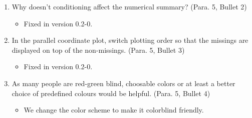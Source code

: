 \documentclass[12pt,english]{article}
\begin{document}
\begin{enumerate}
\item Why doesn\textquoteright{}t conditioning affect the numerical summary?
(Para. 5, Bullet 2)
\begin{itemize}
\item Fixed in version 0.2-0.
\end{itemize}

\item In the parallel coordinate plot, switch plotting order so that the
missings are displayed on top of the non-missings. (Para. 5, Bullet
3)
\begin{itemize}
\item Fixed in version 0.2-0.
\end{itemize}

\item As many people are red-green blind, choosable colors or at least a
better choice of predefined colours would be helpful. (Para. 5, Bullet
4)
\begin{itemize}
\item We change the color scheme to make it colorblind friendly.\end{itemize}
\end{enumerate}
\end{document}

